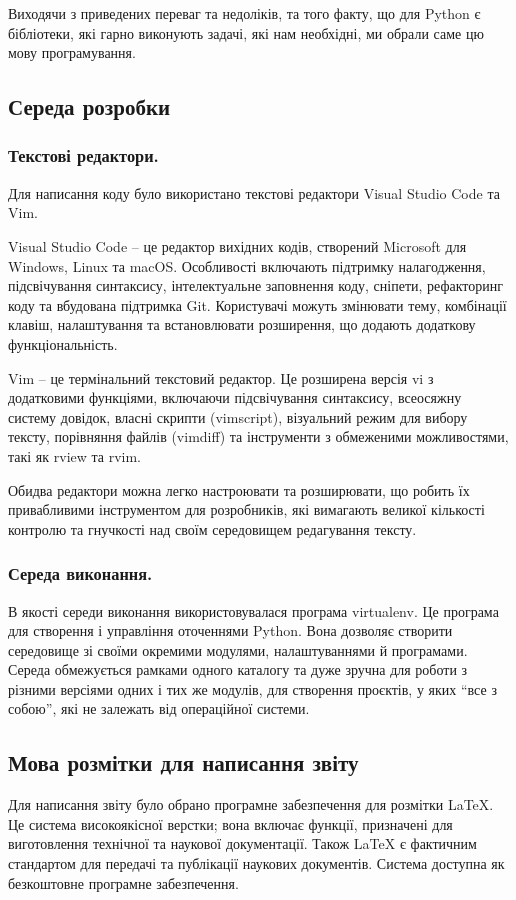 \documentclass[a4paper,14pt]{extreport}
\begin{document}
        Виходячи з приведених переваг та недоліків, та того факту, що для Python є бібліотеки, які гарно виконують задачі, які нам необхідні, ми обрали саме цю мову програмування.

    \subsection{Середа розробки}
        \subsubsection{Текстові редактори.}
        Для написання коду було використано текстові редактори Visual Studio Code та Vim.

        Visual Studio Code -- це редактор вихідних кодів, створений Microsoft для Windows, Linux та macOS. Особливості включають підтримку налагодження, підсвічування синтаксису, інтелектуальне заповнення коду, сніпети, рефакторинг коду та вбудована підтримка Git. Користувачі можуть змінювати тему, комбінації клавіш, налаштування та встановлювати розширення, що додають додаткову функціональність.

        Vim -- це термінальний текстовий редактор. Це розширена версія vi з додатковими функціями, включаючи підсвічування синтаксису, всеосяжну систему довідок, власні скрипти (vimscript), візуальний режим для вибору тексту, порівняння файлів (vimdiff) та інструменти з обмеженими можливостями, такі як rview та rvim.

        Обидва редактори можна легко настроювати та розширювати, що робить їх привабливими інструментом для розробників, які вимагають великої кількості контролю та гнучкості над своїм середовищем редагування тексту.
        
        \subsubsection{Середа виконання.}
        В якості середи виконання використовувалася програма virtualenv. Це програма для створення і управління оточеннями Python. Вона дозволяє створити середовище зі своїми окремими модулями, налаштуваннями й програмами. Середа обмежується рамками одного каталогу та дуже зручна для роботи з різними версіями одних і тих же модулів, для створення проєктів, у яких ``все з собою'', які не залежать від операційної системи.

\subsection{Мова розмітки для написання звіту}
    Для написання звіту було обрано програмне забезпечення для розмітки \LaTeX{}. Це система високоякісної верстки; вона включає функції, призначені для виготовлення технічної та наукової документації. Також \LaTeX{} є фактичним стандартом для передачі та публікації наукових документів. Система доступна як безкоштовне програмне забезпечення.
\end{document}
